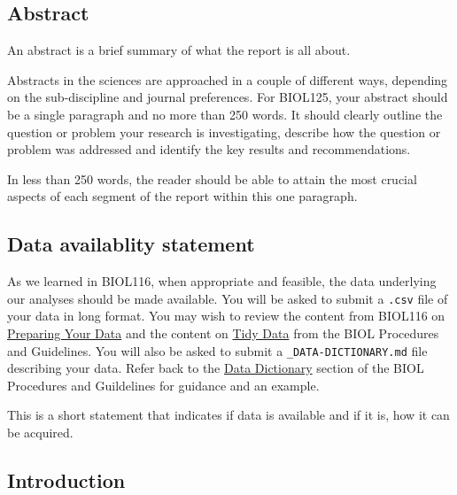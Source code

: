 \documentclass[
]{book}
\begin{document}
\hypertarget{abstract}{%
\subsection*{Abstract}\label{abstract}}

An abstract is a brief summary of what the report is all about.

Abstracts in the sciences are approached in a couple of different ways, depending on the sub-discipline and journal preferences. For BIOL125, your abstract should be a single paragraph and no more than 250 words. It should clearly outline the question or problem your research is investigating, describe how the question or problem was addressed and identify the key results and recommendations.

In less than 250 words, the reader should be able to attain the most crucial aspects of each segment of the report within this one paragraph.

\hypertarget{data-availablity-statement}{%
\subsection*{Data availablity statement}\label{data-availablity-statement}}

As we learned in BIOL116, when appropriate and feasible, the data underlying our analyses should be made available. You will be asked to submit a \texttt{.csv} file of your data in long format. You may wish to review the content from BIOL116 on \href{https://ubco-biology.github.io/BIOL-116-Lab-Manual/preparing-your-data.html}{Preparing Your Data} and the content on \href{https://ubco-biology.github.io/Procedures-and-Guidelines/tidy-data.html}{Tidy Data} from the BIOL Procedures and Guidelines. You will also be asked to submit a \texttt{\_DATA-DICTIONARY.md} file describing your data. Refer back to the \href{https://ubco-biology.github.io/Procedures-and-Guidelines/data-dictionary.html}{Data Dictionary} section of the BIOL Procedures and Guildelines for guidance and an example.

This is a short statement that indicates if data is available and if it is, how it can be acquired.

\hypertarget{introduction}{%
\subsection*{Introduction}\label{introduction}}
\end{document}

